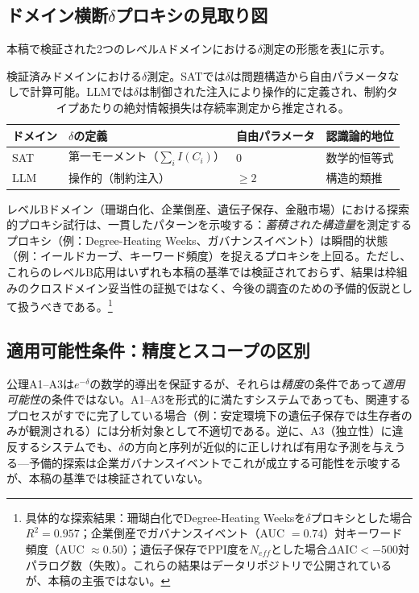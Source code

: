 \documentclass[11pt,a4paper]{article}
\begin{document}
\subsection{ドメイン横断\texorpdfstring{$\delta$}{δ}プロキシの見取り図}

本稿で検証された2つのレベルAドメインにおける$\delta$測定の形態を表\ref{tab:proxy_landscape}に示す。

\begin{table}[ht]
\centering
\small
\begin{tabular}{llll}
\toprule
\textbf{ドメイン} & \textbf{$\delta$の定義} & \textbf{自由パラメータ} & \textbf{認識論的地位} \\
\midrule
SAT & 第一モーメント（$\sum_i I(C_i)$） & 0 & 数学的恒等式 \\
LLM & 操作的（制約注入） & $\geq 2$ & 構造的類推 \\
\bottomrule
\end{tabular}
\caption{検証済みドメインにおける$\delta$測定。SATでは$\delta$は問題構造から自由パラメータなしで計算可能。LLMでは$\delta$は制御された注入により操作的に定義され、制約タイプあたりの絶対情報損失は存続率測定から推定される。}
\label{tab:proxy_landscape}
\end{table}

レベルBドメイン（珊瑚白化、企業倒産、遺伝子保存、金融市場）における探索的プロキシ試行は、一貫したパターンを示唆する：\emph{蓄積された構造量}を測定するプロキシ（例：Degree-Heating Weeks、ガバナンスイベント）は瞬間的状態（例：イールドカーブ、キーワード頻度）を捉えるプロキシを上回る。ただし、これらのレベルB応用はいずれも本稿の基準では検証されておらず、結果は枠組みのクロスドメイン妥当性の証拠ではなく、今後の調査のための予備的仮説として扱うべきである。\footnote{具体的な探索結果：珊瑚白化でDegree-Heating Weeksを$\delta$プロキシとした場合$R^2 = 0.957$；企業倒産でガバナンスイベント（AUC $= 0.74$）対キーワード頻度（AUC $\approx 0.50$）；遺伝子保存でPPI度を$N_{eff}$とした場合$\Delta\text{AIC} < -500$対パラログ数（失敗）。これらの結果はデータリポジトリで公開されているが、本稿の主張ではない。}

\subsection{適用可能性条件：精度とスコープの区別}

公理A1--A3は$e^{-\delta}$の数学的導出を保証するが、それらは\emph{精度}の条件であって\emph{適用可能性}の条件ではない。A1--A3を形式的に満たすシステムであっても、関連するプロセスがすでに完了している場合（例：安定環境下の遺伝子保存では生存者のみが観測される）には分析対象として不適切である。逆に、A3（独立性）に違反するシステムでも、$\delta$の方向と序列が近似的に正しければ有用な予測を与えうる---予備的探索は企業ガバナンスイベントでこれが成立する可能性を示唆するが、本稿の基準では検証されていない。
\end{document}
